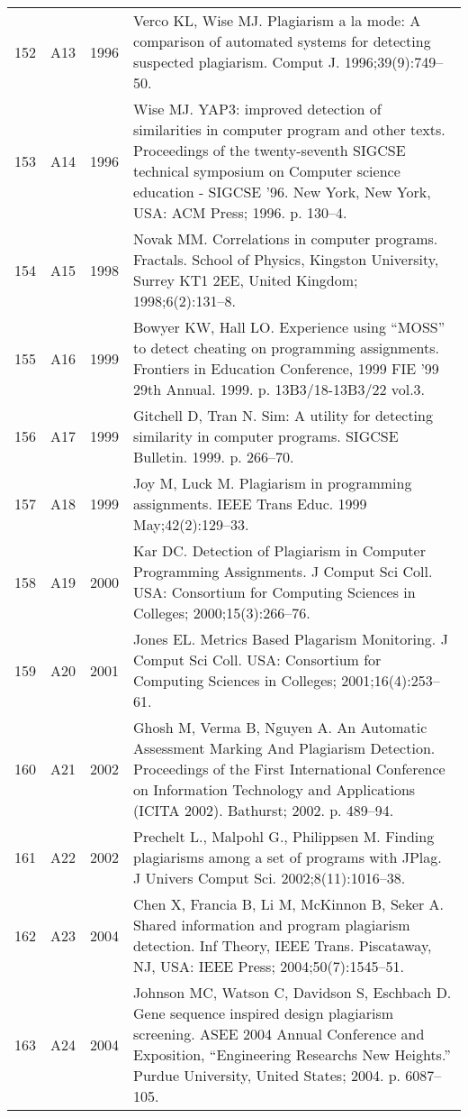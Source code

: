 \documentclass{article}\usepackage[]{graphicx}\usepackage[]{color}
\begin{document}
\begin{longtable}{l|L{1cm}|L{1cm}|L{12cm}|}
  152 & A13 & 1996 & Verco KL, Wise MJ. Plagiarism a la mode: A comparison of automated systems for detecting suspected plagiarism. Comput J. 1996;39(9):749–50. \\ 
  153 & A14 & 1996 & Wise MJ. YAP3: improved detection of similarities in computer program and other texts. Proceedings of the twenty-seventh SIGCSE technical symposium on Computer science education - SIGCSE ’96. New York, New York, USA: ACM Press; 1996. p. 130–4. \\ 
  154 & A15 & 1998 & Novak MM. Correlations in computer programs. Fractals. School of Physics, Kingston University, Surrey KT1 2EE, United Kingdom; 1998;6(2):131–8. \\ 
  155 & A16 & 1999 & Bowyer KW, Hall LO. Experience using “MOSS” to detect cheating on programming assignments. Frontiers in Education Conference, 1999 FIE ’99 29th Annual. 1999. p. 13B3/18-13B3/22 vol.3. \\ 
  156 & A17 & 1999 & Gitchell D, Tran N. Sim: A utility for detecting similarity in computer programs. SIGCSE Bulletin. 1999. p. 266–70. \\ 
  157 & A18 & 1999 & Joy M, Luck M. Plagiarism in programming assignments. IEEE Trans Educ. 1999 May;42(2):129–33. \\ 
  158 & A19 & 2000 & Kar DC. Detection of Plagiarism in Computer Programming Assignments. J Comput Sci Coll. USA: Consortium for Computing Sciences in Colleges; 2000;15(3):266–76. \\ 
  159 & A20 & 2001 & Jones EL. Metrics Based Plagarism Monitoring. J Comput Sci Coll. USA: Consortium for Computing Sciences in Colleges; 2001;16(4):253–61. \\ 
  160 & A21 & 2002 & Ghosh M, Verma B, Nguyen A. An Automatic Assessment Marking And Plagiarism Detection. Proceedings of the First International Conference on Information Technology and Applications (ICITA 2002). Bathurst; 2002. p. 489–94. \\ 
  161 & A22 & 2002 & Prechelt L., Malpohl G., Philippsen M. Finding plagiarisms among a set of programs with JPlag. J Univers Comput Sci. 2002;8(11):1016–38. \\ 
  162 & A23 & 2004 & Chen X, Francia B, Li M, McKinnon B, Seker A. Shared information and program plagiarism detection. Inf Theory, IEEE Trans. Piscataway, NJ, USA: IEEE Press; 2004;50(7):1545–51. \\ 
  163 & A24 & 2004 & Johnson MC, Watson C, Davidson S, Eschbach D. Gene sequence inspired design plagiarism screening. ASEE 2004 Annual Conference and Exposition, “Engineering Researchs New Heights.” Purdue University, United States; 2004. p. 6087–105. \\ 

\end{longtable}
\end{document}
